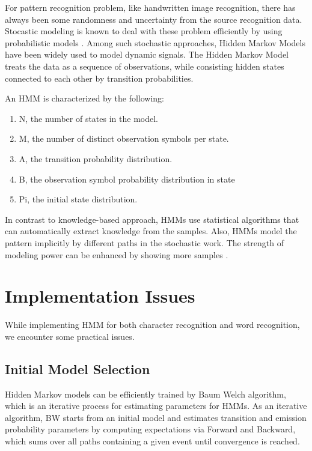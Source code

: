 
For pattern recognition problem, like handwritten image recognition, there has  always been some randomness and uncertainty from the source recognition data. Stocastic modeling is known to deal with these problem efficiently by using probabilistic models \cite{Cho1995}.  Among such stochastic approaches, Hidden Markov Models have been widely used to model dynamic signals.
The Hidden Markov Model treats the data as a sequence of observations, while consisting hidden states connected to each other by transition probabilities.
 
An HMM is characterized by the following\cite{Rabiner1989}:
\begin{enumerate}
\item	N, the number of states in the model.
\item	M, the number of distinct observation symbols per state.
\item	A, the transition probability distribution.
\item	B, the observation symbol probability distribution in state
\item	Pi, the initial state distribution.
\end{enumerate}

In contrast to knowledge-based approach, HMMs use statistical algorithms that can automatically extract knowledge from the samples. Also, HMMs model the pattern implicitly by different paths in the stochastic work. The strength of modeling power can be enhanced by showing more samples
\cite{Cho1995}.

\section{Implementation Issues}

While implementing HMM for both character recognition and word recognition, we encounter some practical issues.

\subsection{Initial Model Selection}


Hidden Markov models can be efficiently trained by Baum Welch algorithm, which is an iterative process for estimating parameters for HMMs. As an iterative algorithm, BW starts from an initial model and estimates transition and emission probability parameters by computing expectations via Forward and Backward, which sums over all paths containing a given event until convergence is reached.

